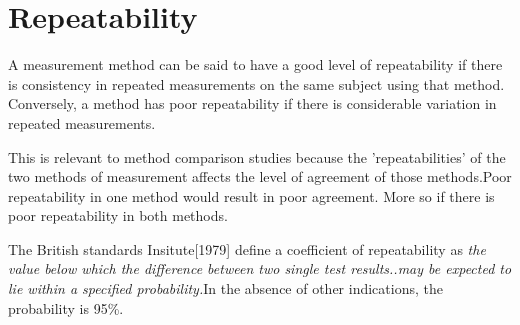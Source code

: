 \documentclass[Chap2cmain.tex]{subfiles}
\begin{document}
\section{Repeatability}
A measurement method can be said to have a good level of repeatability if there is consistency in repeated measurements on
the same subject using that method. Conversely, a method has poor
repeatability if there is considerable variation in repeated measurements.


This is relevant to method comparison studies because the 'repeatabilities' of the two methods of measurement affects the
level of agreement of those methods.Poor repeatability in one method would result in poor agreement. More so if there is poor
repeatability in both methods.

The British standards Insitute[1979] define a coefficient of repeatability  as \emph{the value below which the difference
between two single test results..may be expected to lie within a specified probability.}In the absence of
other indications, the probability is 95\%.
\end{document}
